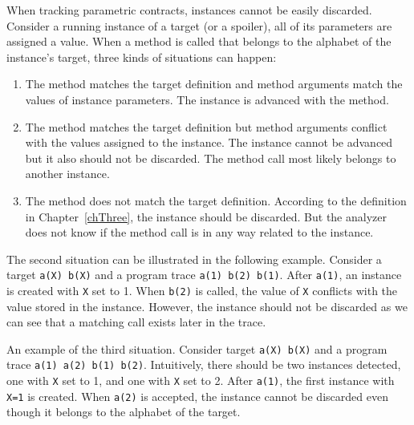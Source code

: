 When tracking parametric contracts, instances cannot be easily discarded.
Consider a running instance of a target (or a spoiler), all of its parameters
are assigned a value. When a method is called that belongs to the alphabet of
the instance's target, three kinds of situations can happen:
\begin{enumerate}
    \item The method matches the target definition and method arguments match
        the values of instance parameters. The instance is advanced with the
        method.
    \item The method matches the target definition but method arguments conflict
        with the values assigned to the instance. The instance cannot be
        advanced but it also should not be discarded. The method call most
        likely belongs to another instance.
    \item The method does not match the target definition. According to the
        definition in Chapter~\ref{chThree}, the instance should be discarded.
        But the analyzer does not know if the method call is in any way related
        to the instance.
\end{enumerate}

The second situation can be illustrated in the following example. Consider a
target \texttt{a(X) b(X)} and a program trace \texttt{a(1) b(2) b(1)}. After
\texttt{a(1)}, an instance is created with \texttt{X} set to 1. When
\texttt{b(2)} is called, the value of \texttt{X} conflicts with the value
stored in the instance. However, the instance should not be discarded as we can
see that a matching call exists later in the trace.

An example of the third situation. Consider target \texttt{a(X) b(X)} and a
program trace \texttt{a(1) a(2) b(1) b(2)}. Intuitively, there should be two
instances detected, one with \texttt{X} set to 1, and one with \texttt{X} set to
2. After \texttt{a(1)}, the first instance with \texttt{X=1} is created. When
\texttt{a(2)} is accepted, the instance cannot be discarded even though it
belongs to the alphabet of the target.

